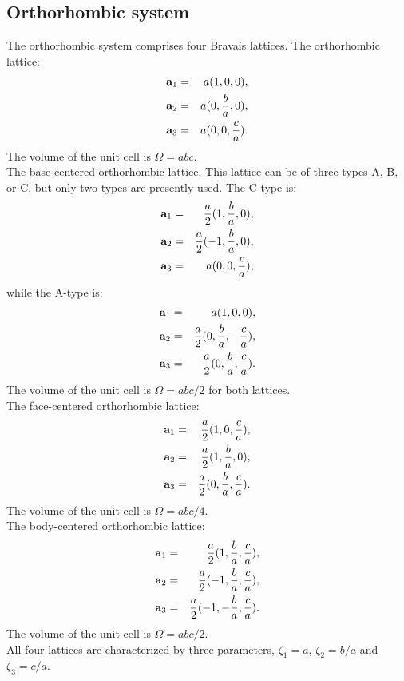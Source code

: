 \documentclass[12pt,a4paper,twoside]{report}
\begin{document}
{\color{web-blue}\subsection{Orthorhombic system}}
\color{black}

The orthorhombic system comprises four Bravais lattices.
The orthorhombic lattice:
\begin{eqnarray}
{\bf a}_1 &=& a (1, 0, 0), \nonumber \\
{\bf a}_2 &=& a (0, {b\over a}, 0), \nonumber \\
{\bf a}_3 &=& a (0, 0, {c\over a}). \nonumber
\nonumber
\end{eqnarray}
The volume of the unit cell is $\Omega = abc$. \\
The base-centered orthorhombic lattice. This lattice can be of three
types A, B, or C, but only two types are presently used. 
The C-type is:
\begin{eqnarray}
{\bf a}_1 &=& {a \over 2} (1, {b \over a}, 0), \nonumber \\
{\bf a}_2 &=& {a \over 2} (-1, {b \over a}, 0), \nonumber \\
{\bf a}_3 &=& a  (0, 0, {c \over a}), \nonumber
\nonumber
\end{eqnarray}
while the A-type is:
\begin{eqnarray}
{\bf a}_1 &=& a  (1, 0, 0), \nonumber \\
{\bf a}_2 &=& {a \over 2} (0, {b \over a}, -{c \over a}), \nonumber \\
{\bf a}_3 &=& {a \over 2} (0, {b \over a}, {c \over a}). \nonumber 
\nonumber
\end{eqnarray}
The volume of the unit cell is $\Omega = abc/2$ for both lattices. \\
The face-centered orthorhombic lattice:
\begin{eqnarray}
{\bf a}_1 &=& {a \over 2} (1, 0, {c \over a}), \nonumber \\
{\bf a}_2 &=& {a \over 2} (1, {b \over a}, 0), \nonumber \\
{\bf a}_3 &=& {a \over 2} (0, {b \over a}, {c \over a}). \nonumber
\nonumber
\end{eqnarray}
The volume of the unit cell is $\Omega = abc/4$. \\
The body-centered orthorhombic lattice:
\begin{eqnarray}
{\bf a}_1 &=& {a \over 2} (1, {b \over a}, {c \over a}), \nonumber \\
{\bf a}_2 &=& {a \over 2} (-1, {b \over a}, {c \over a}), \nonumber \\
{\bf a}_3 &=& {a \over 2} (-1, -{b \over a}, {c \over a}). \nonumber
\nonumber
\end{eqnarray}
The volume of the unit cell is $\Omega = abc/2$. \\
All four lattices are characterized by three parameters, 
$\zeta_1=a$, $\zeta_2=b/a$ and $\zeta_3=c/a$.
\end{document}
